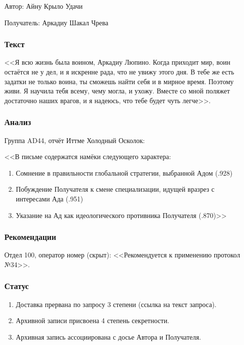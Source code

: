\documentclass[a4paper,10pt]{book}
\begin{document}
Автор: Айну Крыло Удачи

Получатель: Аркадиу Шакал Чрева

\subsubsection{Текст}

<<Я всю жизнь была воином, Аркадиу Люпино. Когда приходит мир, воин остаётся не 
у дел, и я искренне рада, что не увижу этого дня. В тебе же есть задатки не 
только воина, ты сможешь найти себя и в мирное время. Поэтому живи. Я научила 
тебя всему, чему могла, и ухожу. Вместе со мной поляжет достаточно наших 
врагов, и я надеюсь, что тебе будет чуть легче>>.

\subsubsection{Анализ}

Группа AD44, отчёт Иттме Холодный Осколок:

<<В письме содержатся намёки следующего характера:

\begin{enumerate}
\item Сомнение в правильности глобальной стратегии, выбранной Адом (.928)
\item Побуждение Получателя к смене специализации, идущей вразрез с интересами 
Ада (.951)
\item Указание на Ад как идеологического противника Получателя (.870)>>
\end{enumerate}

\subsubsection{Рекомендации}

Отдел 100, оператор номер (скрыт): <<Рекомендуется к применению протокол №34>>.

\subsubsection{Статус}

\begin{enumerate}
\item Доставка прервана по запросу 3 степени (ссылка на текст запроса).
\item Архивной записи присвоена 4 степень секретности.
\item Архивная запись ассоциирована с досье Автора и Получателя.
\end{enumerate}
\end{document}

